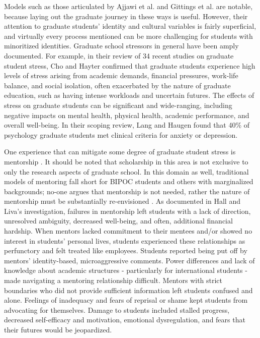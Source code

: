 \documentclass[
  11pt,
]{book}
\begin{document}
Models such as those articulated by Ajjawi et al. \citeyearpar{ajjawi_what_2018} and Gittings et al. \citeyearpar{gittings_doctoral_2018} are notable, because laying out the graduate journey in these ways is useful. However, their attention to graduate students' identity and cultural variables is fairly superficial, and virtually every process mentioned can be more challenging for students with minoritized identities. Graduate school stressors in general have been amply documented. For example, in their review of 34 recent studies on graduate student stress, Cho and Hayter \citeyearpar{cho_under_2021} confirmed that graduate students experience high levels of stress arising from academic demands, financial pressures, work-life balance, and social isolation, often exacerbated by the nature of graduate education, such as having intense workloads and uncertain futures. The effects of stress on graduate students can be significant and wide-ranging, including negative impacts on mental health, physical health, academic performance, and overall well-being. In their scoping review, Lang and Haugen \citeyearpar{lang_stress_2023} found that 40\% of psychology graduate students met clinical criteria for anxiety or depression.

One experience that can mitigate some degree of graduate student stress is mentorship \citep{cannon_relational_2020, mangione_mentoring_2018}. It should be noted that scholarship in this area is not exclusive to only the research aspects of graduate school. In this domain as well, traditional models of mentoring fall short for BIPOC students and others with marginalized backgrounds; no-one argues that mentorship is not needed, rather the nature of mentorship must be substantially re-envisioned \citep{hall_falling_2022, kim_putting_2021, cirillo-mccarthy_developing_2022}. As documented in Hall and Liva's \citeyearpar{hall_falling_2022} investigation, failures in mentorship left students with a lack of direction, unresolved ambiguity, decreased well-being, and often, additional financial hardship. When mentors lacked commitment to their mentees and/or showed no interest in students' personal lives, students experienced these relationships as perfunctory and felt treated like employees. Students reported being put off by mentors' identity-based, microaggressive comments. Power differences and lack of knowledge about academic structures - particularly for international students - made navigating a mentoring relationship difficult. Mentors with strict boundaries who did not provide sufficient information left students confused and alone. Feelings of inadequacy and fears of reprisal or shame kept students from advocating for themselves. Damage to students included stalled progress, decreased self-efficacy and motivation, emotional dysregulation, and fears that their futures would be jeopardized.
\end{document}
